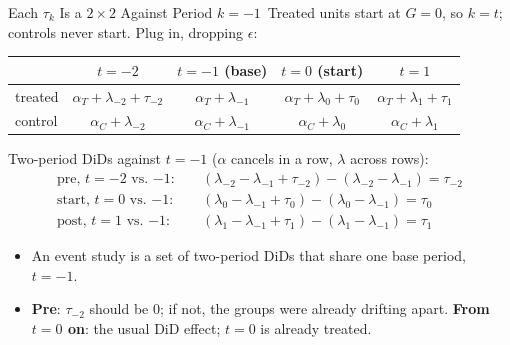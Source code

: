 \documentclass[aspectratio=169,11pt,xcolor=dvipsnames]{beamer}
\newcommand{\core}{\,\raisebox{0.6pt}{\textcolor{corestar}{$\bigstar$}}}
\begin{document}
\begin{frame}{Each $\tau_k$ Is a $2\times2$ Against Period $k = -1$\core}
Treated units start at $G = 0$, so $k = t$; controls never start. Plug in, dropping $\epsilon$:
\begin{center}\footnotesize
\renewcommand{\arraystretch}{1.2}
\begin{tabular}{@{}lcccc@{}}
\toprule
 & $t = -2$ & $t = -1$ (base) & $t = 0$ (start) & $t = 1$ \\
\midrule
treated & $\alpha_T + \lambda_{-2} + \tau_{-2}$ & $\alpha_T + \lambda_{-1}$ & $\alpha_T + \lambda_0 + \tau_0$ & $\alpha_T + \lambda_1 + \tau_1$ \\
control & $\alpha_C + \lambda_{-2}$ & $\alpha_C + \lambda_{-1}$ & $\alpha_C + \lambda_0$ & $\alpha_C + \lambda_1$ \\
\bottomrule
\end{tabular}
\end{center}
\vskip-2pt
Two-period DiDs against $t = -1$ ($\alpha$ cancels in a row, $\lambda$ across rows):
\begin{align*}
  \text{pre, } t = -2 \text{ vs.\ } {-1}:\quad
  &(\lambda_{-2} - \lambda_{-1} + \tau_{-2}) - (\lambda_{-2} - \lambda_{-1}) = \tau_{-2} \\
  \text{start, } t = 0 \text{ vs.\ } {-1}:\quad
  &(\lambda_{0} - \lambda_{-1} + \tau_{0}) - (\lambda_{0} - \lambda_{-1}) = \tau_{0} \\
  \text{post, } t = 1 \text{ vs.\ } {-1}:\quad
  &(\lambda_{1} - \lambda_{-1} + \tau_{1}) - (\lambda_{1} - \lambda_{-1}) = \tau_{1}
\end{align*}
\begin{itemize}\itemsep1pt
  \item An event study is a set of two-period DiDs that share one base period, $t = -1$.
  \item \textbf{Pre}: $\tau_{-2}$ should be 0; if not, the groups were already drifting apart.
        \textbf{From $t = 0$ on}: the usual DiD effect; $t = 0$ is already treated.
\end{itemize}
\end{frame}
\end{document}
